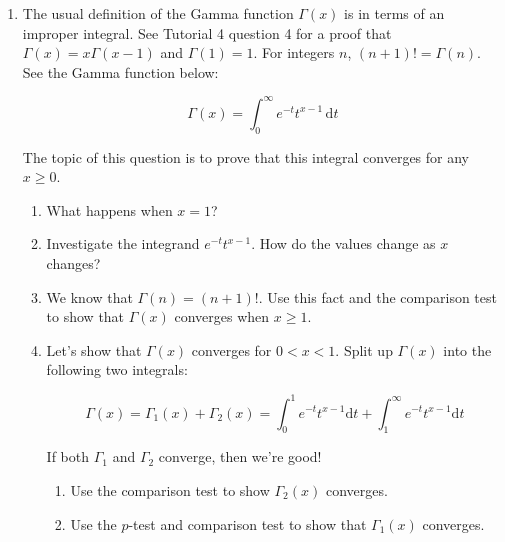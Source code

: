 \begin{enumerate}
\item The usual definition of the Gamma function $\Gamma(x)$ is in terms of an improper integral. See Tutorial 4 question 4 for a proof that $\Gamma(x) = x\Gamma(x-1)$ and $\Gamma(1) = 1$. For integers $n$, $(n+1)! = \Gamma(n)$. See the Gamma function below: 

\[
        \Gamma(x) = \int_0^\infty e^{-t}t^{x-1}\,\mathrm dt
    \]

The topic of this question is to prove that this integral converges for any $x\geq0$. 

\begin{enumerate}
    \item What happens when $x=1$?
    \item Investigate the integrand $e^{-t}t^{x-1}$. How do the values change as $x$ changes?

    \item We know that $\Gamma(n) = (n+1)!$. Use this fact and the comparison test to show that $\Gamma(x)$ converges when $x\geq1$.
    
    \item Let's show that $\Gamma(x)$ converges for $0<x<1$. Split up $\Gamma(x)$ into the following two integrals:

    \[\Gamma(x) = \Gamma_1(x) + \Gamma_2(x) = \int_0^1 e^{-t}t^{x-1}\mathrm dt + \int_1^\infty e^{-t}t^{x-1}\mathrm dt\]

    If both $\Gamma_1$ and $\Gamma_2$ converge, then we're good!

    \begin{enumerate}
        \item Use the comparison test to show $\Gamma_2(x)$ converges.

        \item Use the $p$-test and comparison test to show that $\Gamma_1(x)$ converges. 
    \end{enumerate}

    
\end{enumerate}



\end{enumerate}

